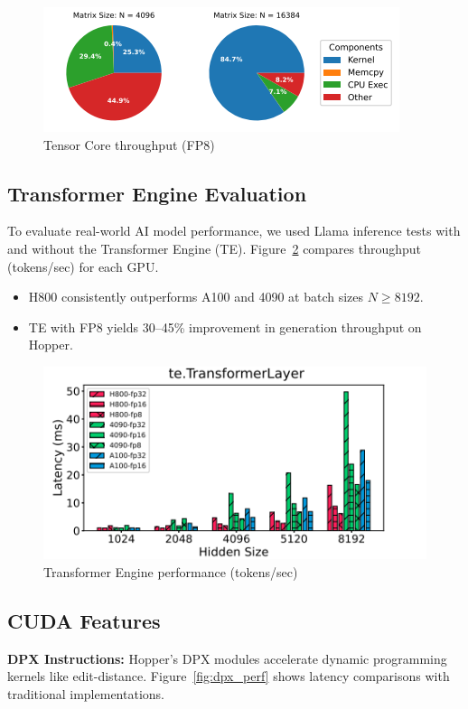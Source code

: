 \begin{figure}[H]
\centering
\includegraphics[width=0.75\linewidth]{images/tc_fp8.png}
\caption{Tensor Core throughput (FP8)}
\label{fig:tc_fp8}
\end{figure}

\subsection{Transformer Engine Evaluation}

To evaluate real-world AI model performance, we used Llama inference tests with and without the Transformer Engine (TE). Figure~\ref{fig:llama_te} compares throughput (tokens/sec) for each GPU.

\begin{itemize}
    \item H800 consistently outperforms A100 and 4090 at batch sizes $N \geq 8192$.
    \item TE with FP8 yields 30--45\% improvement in generation throughput on Hopper.
\end{itemize}

\begin{figure}[H]
\centering
\includegraphics[width=0.8\linewidth]{images/llama_te.png}
\caption{Transformer Engine performance (tokens/sec)}
\label{fig:llama_te}
\end{figure}

\subsection{CUDA Features}

\textbf{DPX Instructions:}  
Hopper's DPX modules accelerate dynamic programming kernels like edit-distance. Figure~\ref{fig:dpx_perf} shows latency comparisons with traditional implementations.

